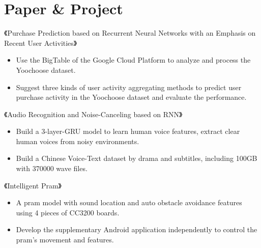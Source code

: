\documentclass{resume}
\begin{document}
\section{Paper \& Project}
《Purchase Prediction based on Recurrent Neural Networks with an Emphasis on Recent User Activities》
\begin{itemize}
  \item Use the BigTable of the Google Cloud Platform to analyze and process the Yoochoose dataset.
  \item Suggest three kinds of user activity aggregating methods to predict user purchase activity in the Yoochoose dataset and evaluate the performance. 
\end{itemize}

《Audio Recognition and Noise-Canceling based on RNN》
\begin{itemize}
  \item Build a 3-layer-GRU model to learn human voice features, extract clear human voices from noisy environments.
  \item Build a Chinese Voice-Text dataset by drama and subtitles, including 100GB with 370000 wave files.
\end{itemize}

《Intelligent Pram》
\begin{itemize}
  \item A pram model with sound location and auto obstacle avoidance features using 4 pieces of CC3200 boards.
  \item Develop the supplementary Android application independently to control the pram's movement and features.
\end{itemize}
\end{document}

